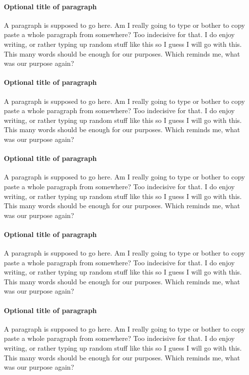 \documentclass{article}
\begin{document}
	\paragraph{Optional title of paragraph}
	A paragraph is supposed to go here. Am I really going to type or bother to copy paste a whole paragraph from somewhere? Too indecisive for that. I do enjoy writing, or rather typing up random stuff like this so I guess I will go with this. This many words should be enough for our purposes. Which reminds me, what was our purpose again?

	\paragraph{Optional title of paragraph}
	A paragraph is supposed to go here. Am I really going to type or bother to copy paste a whole paragraph from somewhere? Too indecisive for that. I do enjoy writing, or rather typing up random stuff like this so I guess I will go with this. This many words should be enough for our purposes. Which reminds me, what was our purpose again?

	\paragraph{Optional title of paragraph}
	A paragraph is supposed to go here. Am I really going to type or bother to copy paste a whole paragraph from somewhere? Too indecisive for that. I do enjoy writing, or rather typing up random stuff like this so I guess I will go with this. This many words should be enough for our purposes. Which reminds me, what was our purpose again?

	\paragraph{Optional title of paragraph}
	A paragraph is supposed to go here. Am I really going to type or bother to copy paste a whole paragraph from somewhere? Too indecisive for that. I do enjoy writing, or rather typing up random stuff like this so I guess I will go with this. This many words should be enough for our purposes. Which reminds me, what was our purpose again?

	\paragraph{Optional title of paragraph}
	A paragraph is supposed to go here. Am I really going to type or bother to copy paste a whole paragraph from somewhere? Too indecisive for that. I do enjoy writing, or rather typing up random stuff like this so I guess I will go with this. This many words should be enough for our purposes. Which reminds me, what was our purpose again?
\end{document}
